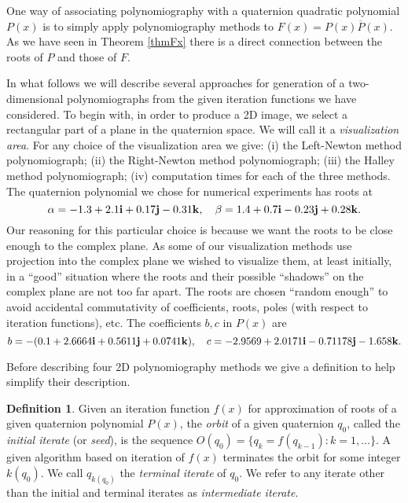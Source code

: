 \documentclass{article}
\theoremstyle{definition}
\newtheorem{definition}{Definition}
\begin{document}
One way of associating polynomiography  with a quaternion quadratic
polynomial $P(x)$ is to simply apply polynomiography methods to
$F(x)= P(x) \overline P(x)$. As we have seen in Theorem \ref{thmFx} there is a direct connection between the roots of $P$ and those of $F$.

In what follows we will describe several approaches for generation of a two-dimensional polynomiographs from the  given iteration functions we have considered. To begin with, in order to produce a 2D image, we select a rectangular part of a plane in the quaternion space. We will call it a {\it visualization area}.
For any choice of the visualization area we give: (i) the Left-Newton method polynomiograph; (ii) the Right-Newton method polynomiograph; (iii) the Halley method polynomiograph; (iv) computation times for each of the three methods.  The quaternion polynomial we chose for numerical experiments has roots at
\begin{equation} \label{roots}
\alpha = -1.3+ 2.1{\bf i} +0.17{\bf j} -0.31{\bf k},\quad \beta =
1.4 +0.7{\bf i} -0.23{\bf j} +0.28{\bf k}.
\end{equation}
Our reasoning for this particular choice is because we want the roots to be close enough to the complex plane. As some of our visualization methods use projection into the complex plane we wished to visualize them, at least initially, in a ``good'' situation where the roots and their possible ``shadows'' on the complex plane are not too far apart.  The roots are chosen ``random enough'' to avoid accidental commutativity of coefficients, roots, poles (with respect to iteration functions), etc. The coefficients $b, c$ in $P(x)$ are
\begin{equation}
b=-(0.1+2.6664 {\bf i} +0.5611 {\bf j} +0.0741 {\bf k}), \quad c=-2.9569+ 2.0171 {\bf i}-0.71178 {\bf j} -1.658 {\bf k}.
\end{equation}

Before describing four 2D polynomiography methods we give a definition to help simplify their description.

\begin{definition} Given an iteration function $f(x)$ for approximation of roots of a given quaternion polynomial $P(x)$, the {\it orbit} of a given quaternion $q_0$, called the {\it initial iterate} (or {\it seed}), is the sequence $O(q_0)=\{q_k=f(q_{k-1}): k=1,  \dots \}$. A given algorithm based on iteration of $f(x)$ terminates the orbit for some integer $k(q_0)$.  We call $q_{k(q_0)}$ the {\it terminal iterate} of $q_0$. We refer to any iterate other than the initial and terminal iterates as {\it intermediate iterate}.
\end{definition}
\end{document}

